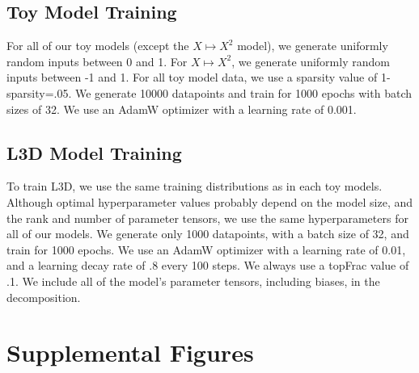 \documentclass{article}
\theoremstyle{plain}
\theoremstyle{definition}
\theoremstyle{remark}
\begin{document}
\subsection{Toy Model Training}\label{sec:toymodel_hyperparams}

For all of our toy models (except the $X \mapsto X^2$ model), we generate uniformly random inputs between 0 and 1. For $X \mapsto X^2$, we generate uniformly random inputs between -1 and 1. For all toy model data, we use a sparsity value of 1-sparsity=.05. We generate 10000 datapoints and train for 1000 epochs with batch sizes of 32. We use an AdamW optimizer with a learning rate of 0.001. 

\subsection{L3D Model Training}\label{sec:L3D_hyperparams}

To train L3D, we use the same training distributions as in each toy models. Although optimal hyperparameter values probably depend on the model size, and the rank and number of parameter tensors, we use the same hyperparameters for all of our models. We generate only 1000 datapoints, with a batch size of 32, and train for 1000 epochs. We use an AdamW optimizer with a learning rate of 0.01, and a learning decay rate of .8 every 100 steps. We always use a topFrac value of .1.  We include all of the model's parameter tensors, including biases, in the decomposition. 

\section{Supplemental Figures}
\end{document}

